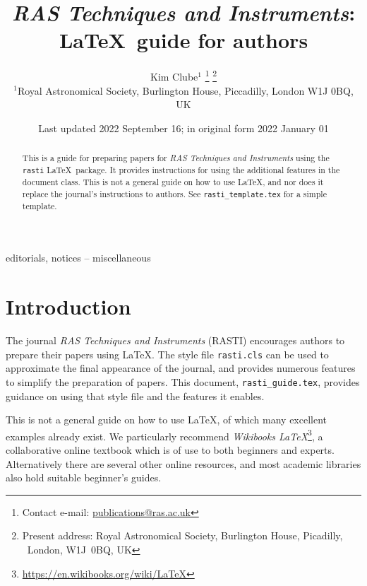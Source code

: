 \documentclass[fleqn,usenatbib,useAMS]{rasti}
\title[RASTI \LaTeX\ guide for authors]{\textit{RAS Techniques and Instruments}:  \LaTeX\ guide for authors}
\author[K. Clube]{Kim Clube$^{1}$%
\thanks{Contact e-mail: \href{mailto:publications@ras.ac.uk}{publications@ras.ac.uk}}%
\thanks{Present address: Royal Astronomical Society, Burlington House, Picadilly, \mbox{}~London, W1J~0BQ, UK}%
\\
$^{1}$Royal Astronomical Society, Burlington House, Piccadilly, London W1J 0BQ, UK}
\date{Last updated 2022 September 16; in original form 2022 January 01}
\begin{document}
\label{firstpage}
\pagerange{\pageref{firstpage}--\pageref{lastpage}}
\maketitle

\begin{abstract}
This is a guide for preparing papers for \textit{RAS Techniques and Instruments} using the \verb'rasti' \LaTeX\ package.
It provides instructions for using the additional features in the document class.
This is not a general guide on how to use \LaTeX, and nor does it replace the journal's instructions to authors.
See \texttt{rasti\_template.tex} for a simple template.
\end{abstract}

\begin{keywords}
editorials, notices -- miscellaneous
\end{keywords}



\begingroup
\let\clearpage\relax
\tableofcontents
\endgroup
\newpage

\section{Introduction}

The journal \textit{RAS Techniques and Instruments} (RASTI) encourages authors to prepare their papers using \LaTeX.
The style file \verb'rasti.cls' can be used to approximate the final appearance of the journal, and provides numerous features to simplify the preparation of papers.
This document, \verb'rasti_guide.tex', provides guidance on using that style file and the features it enables.

This is not a general guide on how to use \LaTeX, of which many excellent examples already exist.
We particularly recommend \textit{Wikibooks \LaTeX}\footnote{\url{https://en.wikibooks.org/wiki/LaTeX}}, a collaborative online textbook which is of use to both beginners and experts.
Alternatively there are several other online resources, and most academic libraries also hold suitable beginner's guides.
\end{document}

